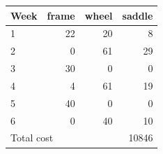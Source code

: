 \begin{tabular}{lrrr}
\hline
Week & frame & wheel & saddle \\
\hline
1 & 22 & 20 & 8 \\
2 & 0 & 61 & 29 \\
3 & 30 & 0 & 0 \\
4 & 4 & 61 & 19 \\
5 & 40 & 0 & 0 \\
6 & 0 & 40 & 10 \\
\hline
\multicolumn{3}{l}{Total cost} & 10846 \\
\hline
\end{tabular}
